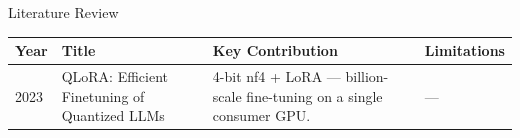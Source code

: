 \begin{frame}{Literature Review}
  \lrtable
  \begin{tabularx}{\textwidth}{p{0.7cm} p{2.8cm} X X}
    \toprule
    \textbf{Year} & \textbf{Title} & \textbf{Key Contribution} & \textbf{Limitations} \\
    \midrule
    2023 \cite{dettmers2023qlora}
    & QLoRA: Efficient Finetuning of Quantized LLMs
    & 4-bit nf4 + LoRA --- billion-scale fine-tuning on a single consumer GPU.
    & --- \\
    \bottomrule
  \end{tabularx}
\end{frame}
